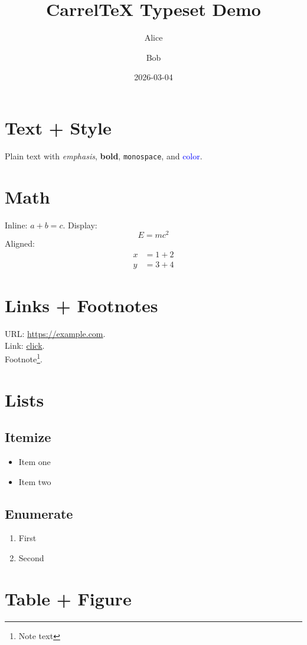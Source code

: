\documentclass{article}
\title{CarrelTeX Typeset Demo}
\author{Alice \and Bob}
\date{2026-03-04}
\begin{document}
\maketitle

\section{Text + Style}
Plain text with \emph{emphasis}, \textbf{bold}, \texttt{monospace}, and \textcolor{blue}{color}.

\section{Math}
Inline: $a+b=c$.
Display:
\[
  E = mc^2
\]
Aligned:
\begin{align}
  x &= 1 + 2 \\
  y &= 3 + 4
\end{align}

\section{Links + Footnotes}
URL: \url{https://example.com}.\\
Link: \href{https://example.com}{click}.\\
Footnote\footnote{Note text}.

\section{Lists}
\subsection{Itemize}
\begin{itemize}
  \item Item one
  \item Item two
\end{itemize}

\subsection{Enumerate}
\begin{enumerate}
  \item First
  \item Second
\end{enumerate}

\section{Table + Figure}
\end{document}

